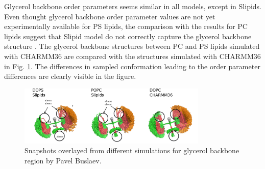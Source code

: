 \documentclass[aps,prl,superscriptaddress,twocolumn]{revtex4}
\begin{document}
Glycerol backbone order parameters seems similar in all models,
except in Slipids. Even thought glycerol backbone order parameter
values are not yet experimentally available for PS lipids,
the comparison with the results for PC lipids suggest that
Slipid model do not correctly capture the glycerol backbone
structure \cite{botan15}. The glycerol backbone structures between PC and
PS lipids simulated with CHARMM36 are compared with the structures
simulated with CHARMM36 in Fig. \ref{glycerol_buslaev}.
The differences in sampled conformation leading to the order parameter
differences are clearly visible in the figure.
\begin{figure}[]
  \centering
  \includegraphics[width=9.0cm]{../Figs/glycerol_buslaev.png}
  \caption{\label{glycerol_buslaev}
    Snapshots overlayed from different simulations for glycerol backbone region
    by Pavel Buslaev.
  }
\end{figure}

\end{document}
